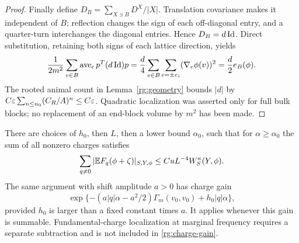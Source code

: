 \begin{proof}
Finally define $D_B=\sum_{X\ni B}D^X/|X|$.  Translation covariance makes it independent of $B$; reflection changes the sign of each off-diagonal entry, and a quarter-turn interchanges the diagonal entries.  Hence $D_B=d\operatorname{Id}$.  Direct substitution, retaining both signs of each lattice direction, yields
\[
 \frac1{2m^2}\sum_{v\in B}\operatorname{ave}_{\epsilon}p^T(d\operatorname{Id})p
 =\frac d4\sum_{v\in B}\sum_{e=\pm e_i}(\nabla_e\phi(v))^2
 =\frac d2 e_B(\phi).
\]
The rooted animal count in Lemma~\ref{rg:geometry} bounds $|d|$ by $C\varepsilon\sum_{n\le n_0}(C_R/A)^n\le C\varepsilon$.  Quadratic localization was asserted only for full bulk blocks; no replacement of an end-block volume by $m^2$ has been made.
\end{proof}

\begin{lemma}\label{rg:charged}
There are choices of $h_0$, then $L$, then a lower bound $\alpha_0$, such that for $\alpha\ge\alpha_0$ the sum of all nonzero charges satisfies
\begin{equation}\label{rg:charge-gain}
 \sum_{q\ne0}|\mathbb E F_q(\phi+\zeta)|_{S,Y,\phi}
 \le CuL^{-4}W_S^\kappa(Y,\phi).
\end{equation}
The same argument with shift amplitude $a>0$ has charge gain
\begin{equation}\label{rg:general-charge-gain}
 \exp\{-(a|q|\alpha-a^2/2)\Gamma_m(v_0,v_0)+h_0|q|\alpha\},
\end{equation}
provided $h_0$ is larger than a fixed constant times $a$.  It applies whenever this gain is summable.  Fundamental-charge localization at marginal frequency requires a separate subtraction and is not included in \eqref{rg:charge-gain}.
\end{lemma}

